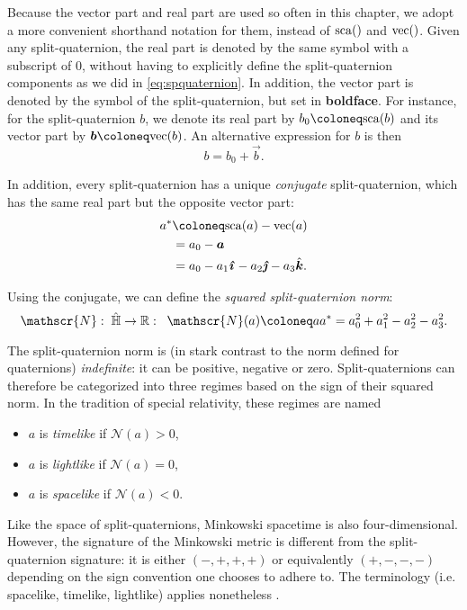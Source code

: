 
Because the vector part and real part are used so often in this chapter, we adopt a more convenient shorthand notation for them, instead of $\mathrm{sca}\qty()$ and $\mathrm{vec}\qty()$. Given any split-quaternion, the real part is denoted by the same symbol with a subscript of 0, without having to explicitly define the split-quaternion components as we did in \cref{eq:spquaternion}. In addition, the vector part is denoted by the symbol of the split-quaternion, but set in \textbf{boldface}. For instance, for the split-quaternion $b$, we denote its real part by $b_0 \coloneq \scapart{b}$ and its vector part by $\vec{b} \coloneq \vecpart{b}$. An alternative expression for $b$ is then
\begin{equation}
     b = b_0 + \vec{b}.
\end{equation}

In addition, every split-quaternion has a unique \emph{conjugate} split-quaternion, which has the same real part but the opposite vector part:
\begin{equation}
    \begin{split}
     \conj{a} &\coloneq \scapart{a} - \vecpart{a} \\
              &= a_0 - \vec{a}  \\
              &= a_0 - a_1\quati - a_2\quatj - a_3\quatk.
     \end{split}
\end{equation}

Using the conjugate, we can define the \emph{squared split-quaternion norm}:
\begin{equation}
    \mathscr{N}:\;\spquaternions \to \real:\;\;\mathscr{N}(a) \coloneq a\conj{a} = a_0^2 + a_1^2 - a_2^2 - a_3^2. 
    \label{eq:quat_norm}
\end{equation}

The split-quaternion norm is (in stark contrast to the norm defined for quaternions) \emph{indefinite}: it can be positive, negative or zero. Split-quaternions can therefore be categorized into three regimes based on the sign of their squared norm. In the tradition of special relativity, these regimes are named
\begin{itemize}
    \item $a$ is \emph{timelike} if \( \mathscr{N}(a) > 0 \),
    \item $a$ is \emph{lightlike} if \( \mathscr{N}(a) = 0 \), 
    \item $a$ is \emph{spacelike} if \( \mathscr{N}(a) < 0 \).
\end{itemize}
Like the space of split-quaternions, Minkowski spacetime is also four-dimensional. However, the signature of the Minkowski metric is different from the split-quaternion signature: it is either \((-, +, +, +)\) or equivalently \( (+, -, -, -)\) depending on the sign convention one chooses to adhere to. The terminology (i.e. spacelike, timelike, lightlike) applies nonetheless \cite{Misner1970,Landau1971}.

